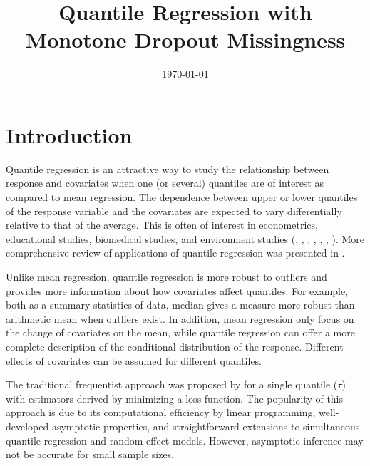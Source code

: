 \documentclass[12pt]{article}
\title{Quantile Regression with Monotone Dropout Missingness}
\date{\today}
\author{}
\begin{document}
\maketitle

\begin{abstract}
\end{abstract}

\section{Introduction}

Quantile regression is an attractive way to study the relationship
between response and covariates when one (or several) quantiles are of
interest as compared to mean regression.  The dependence between upper
or lower quantiles of the response variable and the covariates are
expected to vary differentially relative to that of the average. This
is often of interest in econometrics, educational studies, biomedical
studies, and environment studies (\citet{yu2001},
\citet{buchinsky1994}, \citet{buchinsky1998}, \citet{he1998},
\citet{koenker1999}, \citet{wei2006}, \citet{yu2003}). More
comprehensive review of applications of quantile regression was
presented in \citet{koenker2005}.

Unlike mean regression, quantile regression is more robust to outliers
and provides more information about how covariates affect
quantiles. For example, both as a summary statistics of data, median
gives a measure more robust than arithmetic mean when outliers
exist. In addition, mean regression only focus on the change of
covariates on the mean, while quantile regression can offer a more
complete description of the conditional distribution of the
response. Different effects of covariates can be assumed for different
quantiles.

The traditional frequentist approach was proposed by
\citet{koenker1978} for a single quantile ($\tau$) with estimators
derived by minimizing a loss function. The popularity of this approach
is due to its computational efficiency by linear programming,
well-developed asymptotic properties, and straightforward extensions
to simultaneous quantile regression and random effect models. However,
asymptotic inference may not be accurate for small sample sizes.
\end{document}
